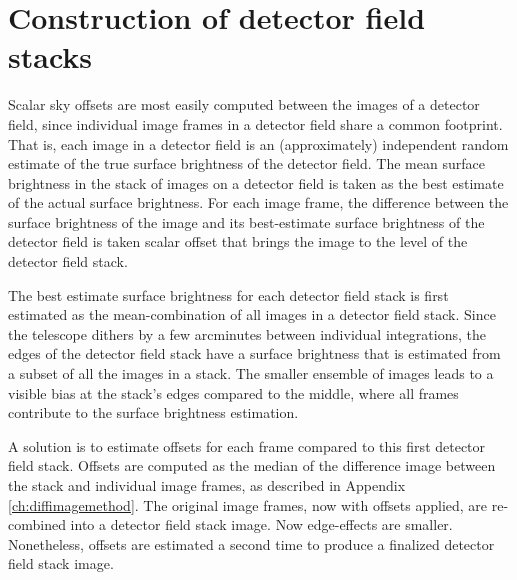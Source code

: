 \documentclass[iop]{emulateapj}
\begin{document}
\section{Construction of detector field stacks}
\label{sec:intradet}

Scalar sky offsets are most easily computed between the images of a detector field, since individual image frames in a detector field share a common footprint. That is, each image in a detector field is an (approximately) independent random estimate of the true surface brightness of the detector field. The mean surface brightness in the stack of images on a detector field is taken as the best estimate of the actual surface brightness. For each image frame, the difference between the surface brightness of the image and its best-estimate surface brightness of the detector field is taken scalar offset that brings the image to the level of the detector field stack.

The best estimate surface brightness for each detector field stack is first estimated as the mean-combination of all images in a detector field stack.  Since the telescope dithers by a few arcminutes between individual integrations, the edges of the detector field stack have a surface brightness that is estimated from a subset of all the images in a stack. The smaller ensemble of images leads to a visible bias at the stack's edges compared to the middle, where all frames contribute to the surface brightness estimation.

A solution is to estimate offsets for each frame compared to this first detector field stack. Offsets are computed as the median of the difference image between the stack and individual image frames, as described in Appendix \ref{ch:diffimagemethod}. The original image frames, now with offsets applied, are re-combined into a detector field stack image. Now edge-effects are smaller. Nonetheless, offsets are estimated a second time to produce a finalized detector field stack image.
\end{document}

